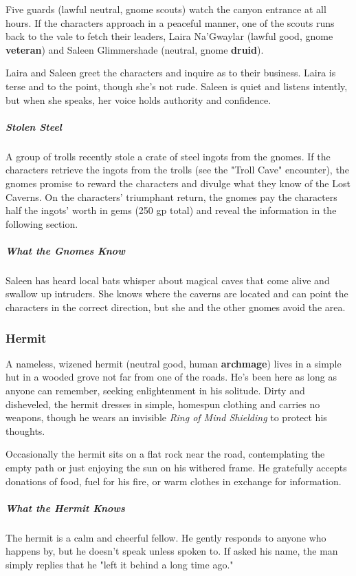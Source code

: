 \documentclass[10pt,a4paper,twoside,bg=print,twocolumn,openany,nodeprecatedcode]{dndbook}
\begin{document}
Five guards (lawful neutral, gnome scouts) watch the canyon entrance at all hours. If the characters approach in a peaceful manner, one of the scouts runs back to the vale to fetch their leaders, Laira Na'Gwaylar (lawful good, gnome \textbf{veteran}) and Saleen Glimmershade (neutral, gnome \textbf{druid}).

Laira and Saleen greet the characters and inquire as to their business. Laira is terse and to the point, though she's not rude. Saleen is quiet and listens intently, but when she speaks, her voice holds authority and confidence.

\subparagraph{Stolen Steel}
A group of trolls recently stole a crate of steel ingots from the gnomes. If the characters retrieve the ingots from the trolls (see the "Troll Cave" encounter), the gnomes promise to reward the characters and divulge what they know of the Lost Caverns. On the characters' triumphant return, the gnomes pay the characters half the ingots' worth in gems (250 gp total) and reveal the information in the following section.

\subparagraph{What the Gnomes Know}
Saleen has heard local bats whisper about magical caves that come alive and swallow up intruders. She knows where the caverns are located and can point the characters in the correct direction, but she and the other gnomes avoid the area.

\subsubsection{Hermit}
A nameless, wizened hermit (neutral good, human \textbf{archmage}) lives in a simple hut in a wooded grove not far from one of the roads. He's been here as long as anyone can remember, seeking enlightenment in his solitude. Dirty and disheveled, the hermit dresses in simple, homespun clothing and carries no weapons, though he wears an invisible \textit{Ring of Mind Shielding} to protect his thoughts.

Occasionally the hermit sits on a flat rock near the road, contemplating the empty path or just enjoying the sun on his withered frame. He gratefully accepts donations of food, fuel for his fire, or warm clothes in exchange for information.

\subparagraph{What the Hermit Knows}
The hermit is a calm and cheerful fellow. He gently responds to anyone who happens by, but he doesn't speak unless spoken to. If asked his name, the man simply replies that he "left it behind a long time ago."
\end{document}
